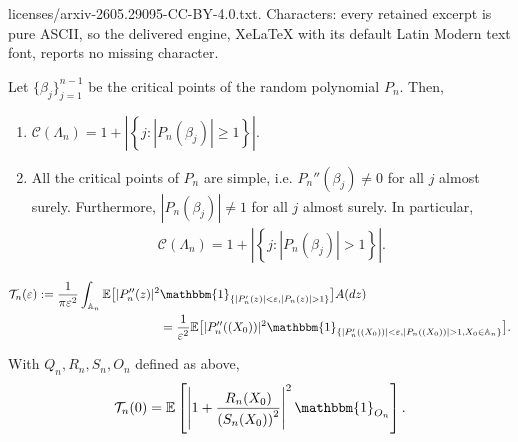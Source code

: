 \documentclass[10pt,a4paper]{amsart}
\newcommand{\mb}{\mathbb}
\renewcommand\epsilon{\varepsilon}
\begin{document}
licenses/arxiv-2605.29095-CC-BY-4.0.txt. Characters: every retained excerpt is pure ASCII, so the delivered engine, XeLaTeX with its default Latin Modern text font, reports no missing character.
\begin{Lemma}\label{components=critical}
Let $\{\beta_j\}_{j=1}^{n-1}$ be the critical points of the random polynomial $P_n$. Then,
\begin{enumerate}[label=(\alph*)]
    \item $\mathscr{C}(\Lambda_n)= 1+ \left|\left\{ j: |P_n(\beta_j)| \geq 1\right \}\right|$. 
    
    \item All the critical points of $P_n$ are simple, i.e. $P_n''(\beta_j) \neq 0$ for all $j$ almost surely. Furthermore, $|P_n(\beta_j)| \neq 1 $ for all $j$  almost surely. In particular, 
    \begin{align*}
           \mathscr{C}(\Lambda_n)= 1+ \left|\left\{ j: |P_n(\beta_j)| > 1\right \}\right|. 
    \end{align*}
\end{enumerate}
\end{Lemma}

\begin{align}\nonumber \label{trick}
    \mathcal{T}_n(\epsilon) := \frac{1}{\pi \epsilon^2 }\int_{\mb{A}_n} \mb{E}\bigl[|P_n''(z)|^2 &\mathbbm{1}_{\{|P_n'(z)|<\epsilon, |P_n(z)| >1\}}\bigr] A(dz) \\& = \frac{1}{\epsilon^2} \mb{E}\bigl[|P_n''((X_0))|^2 \mathbbm{1}_{\{|P_n'((X_0))|<\epsilon, |P_n((X_0))| >1, X_0 \in \mb{A}_n\}}\bigr].
\end{align}  

\begin{prop} \label{key-prop} With $Q_n, R_n, S_n, O_n$ defined as above, 
\begin{equation}\label{T(0)=nice}
    \mathcal{T}_n(0) = \mathbb{E}\left[ \left| 1 + 
    \frac{R_n(X_0)}
         { \left(S_n(X_0)\right)^2 }
    \right|^2 \mathbbm{1}_{O_n}\right]. 
\end{equation} 
\end{prop}
\end{document}
